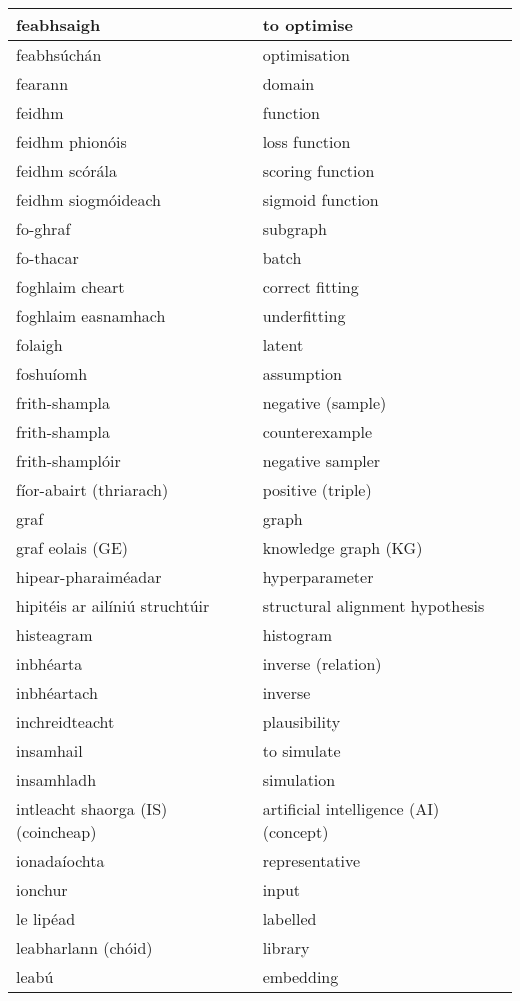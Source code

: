 \documentclass{article}
\begin{document}
\begin{longtable}{|l|l|}
		feabhsaigh&to optimise\\ \hline 
		feabhsúchán&optimisation\\ \hline 
		fearann&domain\\ \hline 
		feidhm&function\\ \hline 
		feidhm phionóis&loss function\\ \hline 
		feidhm scórála&scoring function\\ \hline 
		feidhm siogmóideach&sigmoid function\\ \hline 
		fo-ghraf&subgraph\\ \hline 
		fo-thacar&batch\\ \hline 
		foghlaim cheart&correct fitting\\ \hline 
		foghlaim easnamhach&underfitting\\ \hline 
		folaigh&latent\\ \hline 
		foshuíomh&assumption\\ \hline 
		frith-shampla&negative (sample)\\ \hline 
		frith-shampla&counterexample\\ \hline 
		frith-shamplóir&negative sampler\\ \hline 
		fíor-abairt (thriarach)&positive (triple)\\ \hline 
		graf&graph\\ \hline 
		graf eolais (GE)&knowledge graph (KG)\\ \hline 
		hipear-pharaiméadar&hyperparameter\\ \hline 
		hipitéis ar ailíniú struchtúir&structural alignment hypothesis\\ \hline 
		histeagram&histogram\\ \hline 
		inbhéarta&inverse (relation)\\ \hline 
		inbhéartach&inverse\\ \hline 
		inchreidteacht&plausibility\\ \hline 
		insamhail&to simulate\\ \hline 
		insamhladh&simulation\\ \hline 
		intleacht shaorga (IS) (coincheap)&artificial intelligence (AI) (concept)\\ \hline 
		ionadaíochta&representative\\ \hline 
		ionchur&input\\ \hline 
		le lipéad&labelled\\ \hline 
		leabharlann (chóid)&library\\ \hline 
		leabú&embedding\\ \hline 

\end{longtable}
\end{document}
